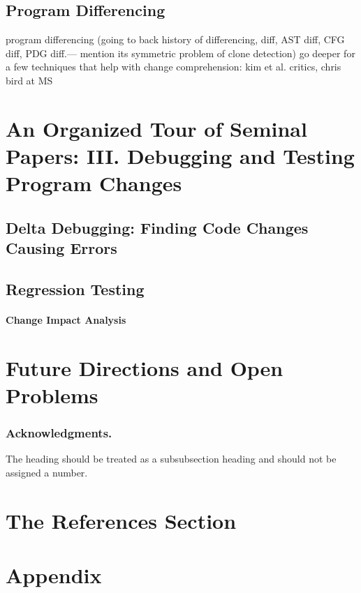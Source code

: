 \documentclass[runningheads,a4paper]{llncs}
\begin{document}
\subsection{Program Differencing} 
program differencing (going to back history of differencing, diff, AST diff, CFG diff, PDG diff.--- mention its symmetric problem of clone detection)
go deeper for a few techniques that help with change comprehension: kim et al. critics, chris bird at MS


\section{An Organized Tour of Seminal Papers: III. Debugging and Testing Program Changes} 

\subsection{Delta Debugging: Finding Code Changes Causing Errors}
\subsection{Regression Testing} 
\paragraph{Change Impact Analysis} 

\section{Future Directions and Open Problems} 


\subsubsection*{Acknowledgments.} The heading should be treated as a
subsubsection heading and should not be assigned a number.

\section{The References Section}\label{references}



\section*{Appendix} 
\end{document}
